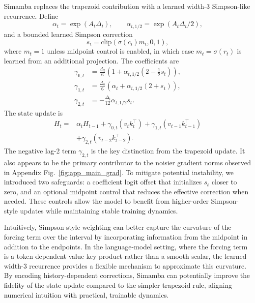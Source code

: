 \documentclass[conference]{IEEEtran}
\newcommand{\modelname}{Simamba\xspace}
\begin{document}
\modelname{} replaces the trapezoid contribution with a learned width-3 Simpson-like recurrence. Define
\begin{equation}
    \alpha_t = \exp(A_t\Delta_t), \qquad
    \alpha_{t,1/2} = \exp(A_t\Delta_t/2),
\end{equation}
and a bounded learned Simpson correction
\begin{equation}
    s_t = \mathrm{clip}(\sigma(c_t)m_t,0,1),
\end{equation}
where $m_t=1$ unless midpoint control is enabled, in which case $m_t=\sigma(r_t)$ is learned from an additional projection. The coefficients are
\begin{align}
    \gamma_{0,t} &= \frac{\Delta_t}{6}\left(1+\alpha_{t,1/2}(2-\frac{1}{2}s_t)\right),\\
    \gamma_{1,t} &= \frac{\Delta_t}{6}\left(\alpha_t+\alpha_{t,1/2}(2+s_t)\right),\\
    \gamma_{2,t} &= -\frac{\Delta_t}{12}\alpha_{t,1/2}s_t .
\end{align}
The state update is
\begin{equation}
\begin{split}
H_t ={}& \alpha_t H_{t-1}
    + \gamma_{0,t}(v_tk_t^\top)
    + \gamma_{1,t}(v_{t-1}k_{t-1}^\top)\\
    &+ \gamma_{2,t}(v_{t-2}k_{t-2}^\top).
\end{split}
\label{eq:simpson}
\end{equation}
The negative lag-2 term $\gamma_{2,t}$ is the key distinction from the trapezoid update. It also appears to be the primary contributor to the noisier gradient norms observed in Appendix Fig.~\ref{fig:app_main_grad}. To mitigate potential instability, we introduced two safeguards: a coefficient logit offset that initializes $s_t$ closer to zero, and an optional midpoint control that reduces the effective correction when needed. These controls allow the model to benefit from higher-order Simpson-style updates while maintaining stable training dynamics.

Intuitively, Simpson-style weighting can better capture the curvature of the forcing term over the interval by incorporating information from the midpoint in addition to the endpoints. In the language-model setting, where the forcing term is a token-dependent value-key product rather than a smooth scalar, the learned width-3 recurrence provides a flexible mechanism to approximate this curvature. By encoding history-dependent corrections, \modelname{} can potentially improve the fidelity of the state update compared to the simpler trapezoid rule, aligning numerical intuition with practical, trainable dynamics.
\end{document}
